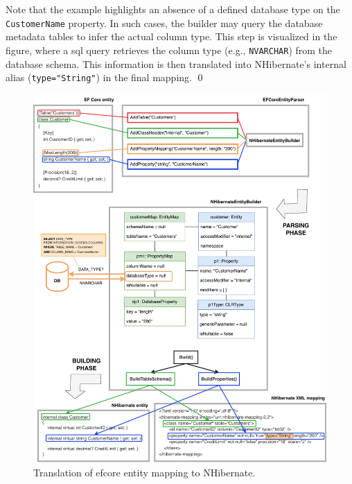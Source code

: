 \begin{example}
Note that the example highlights an absence of a defined database type on the \texttt{CustomerName} property. In such cases, the builder may query the database metadata tables to infer the actual column type. This step is visualized in the figure, where a \acrshort{sql} query retrieves the column type (e.g., \texttt{NVARCHAR}) from the database schema. This information is then translated into NHibernate's internal alias (\texttt{type="String"}) in the final mapping.
\qed
\end{example}

\begin{figure}[!htp]
  \centering
  \includegraphics[width=\textwidth]{thesis/img/thesis/03_parsing_building.drawio.pdf}
  \caption{Translation of \acrshort{efcore} entity mapping to NHibernate.}
  \label{fig:translation_complete}
\end{figure}


